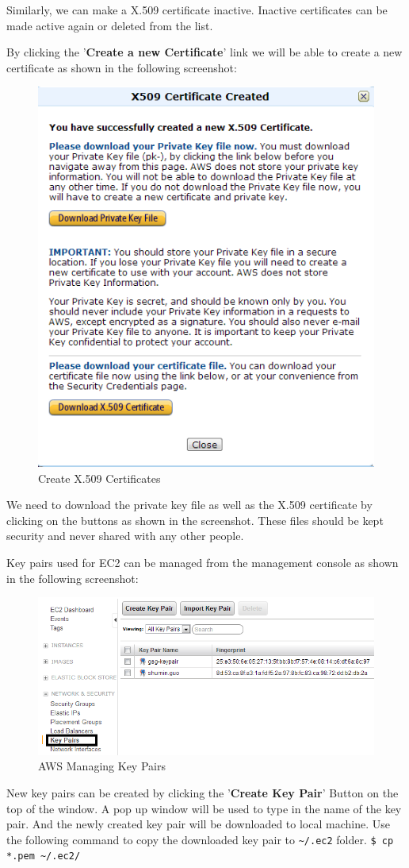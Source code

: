 Similarly, we can make a X.509 certificate inactive. Inactive certificates can be made active again or deleted from the list.

By clicking the '\textbf{Create a new Certificate}' link we will be able to create a new certificate as shown in the following screenshot:
\begin{figure}[ht]
  \centering
  \includegraphics[width=.65\textwidth]{figs/5163os_08_10.png}
  \caption{Create X.509 Certificates}\label{fig:aws.create.x509}
\end{figure} 
We need to download the private key file as well as the X.509 certificate by clicking on the buttons as shown in the screenshot. These files should be kept security and never shared with any other people.

Key pairs used for EC2 can be managed from the management console as shown in the following screenshot:
\begin{figure}[ht]
  \centering
  \includegraphics[width=.8\textwidth]{figs/5163os_08_14.png}
  \caption{AWS Managing Key Pairs}\label{fig:aws.keypair.management}
\end{figure} 
New key pairs can be created by clicking the '\textbf{Create Key Pair}' Button on the top of the window. A pop up window will be used to type in the name of the key pair. And the newly created key pair will be downloaded to local machine.
Use the following command to copy the downloaded key pair to \verb|~/.ec2| folder.
\verb|$ cp *.pem ~/.ec2/|

